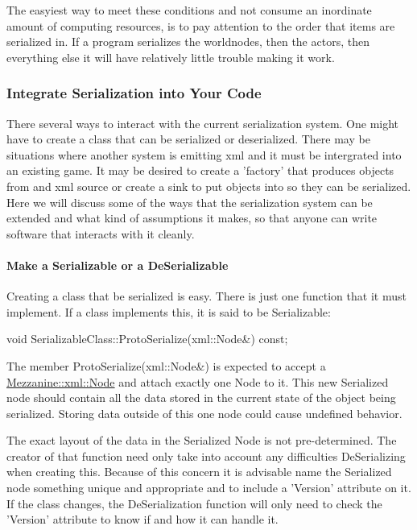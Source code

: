 The easyiest way to meet these conditions and not consume an inordinate amount of computing resources, is to pay attention to the order that items are serialized in. If a program serializes the worldnodes, then the actors, then everything else it will have relatively little trouble making it work. \hypertarget{Serialization_serializationintegration}{}\subsubsection{Integrate Serialization into Your Code}\label{Serialization_serializationintegration}
There several ways to interact with the current serialization system. One might have to create a class that can be serialized or deserialized. There may be situations where another system is emitting xml and it must be intergrated into an existing game. It may be desired to create a 'factory' that produces objects from and xml source or create a sink to put objects into so they can be serialized. Here we will discuss some of the ways that the serialization system can be extended and what kind of assumptions it makes, so that anyone can write software that interacts with it cleanly. \hypertarget{Serialization_serializationmaking}{}\paragraph{Make a Serializable or a DeSerializable}\label{Serialization_serializationmaking}
Creating a class that be serialized is easy. There is just one function that it must implement. If a class implements this, it is said to be Serializable: 
\begin{DoxyCode}
 void SerializableClass::ProtoSerialize(xml::Node&) const;
\end{DoxyCode}
 The member ProtoSerialize(xml::Node\&) is expected to accept a \hyperlink{classMezzanine_1_1xml_1_1Node}{Mezzanine::xml::Node} and attach exactly one Node to it. This new Serialized node should contain all the data stored in the current state of the object being serialized. Storing data outside of this one node could cause undefined behavior. \par
 \par
 The exact layout of the data in the Serialized Node is not pre-\/determined. The creator of that function need only take into account any difficulties DeSerializing when creating this. Because of this concern it is advisable name the Serialized node something unique and appropriate and to include a 'Version' attribute on it. If the class changes, the DeSerialization function will only need to check the 'Version' attribute to know if and how it can handle it. \par
